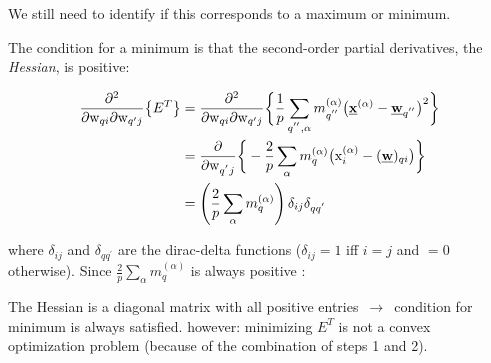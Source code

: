 \begin{frame}

We still need to identify if this corresponds to a maximum or minimum.


The condition for a minimum is that the second-order partial derivatives, the \emph{Hessian}, is positive:

\begin{align}
	\frac{\partial^2}{\partial \mathrm{w}_{qi} \partial \mathrm{w}_{
			q'j}} \big\{ E^T\big\}
	&=
		\frac{\partial^2}{\partial \mathrm{w}_{qi} \partial \mathrm{w}_{
			q'j}} \bigg\{ \frac{1}{p} \sum\limits_{q^{''}, \alpha}
			m_{q^{''}}^{(\alpha)} \big( \vec{x}^{(\alpha)} - \vec{w}_{q^{''}}
			\big)^2 \bigg\} \\
		& = \frac{\partial}{\partial \mathrm{w}_{q^{'}j}} \bigg\{
			-\frac{2}{p} \sum\limits_{\alpha} m_q^{(\alpha)} 
			\big( \mathrm{x}_i^{(\alpha)} - (\vec{w})_{qi}
			\big) \bigg\} \\
\notesonly{
		& = \left( \frac{2}{p} \sum\limits_{\alpha} m_q^{(\alpha)} \right)
			\delta_{ij} \delta_{qq^{'}}
			}
\end{align}
\end{frame}

\begin{frame}

where $\delta_{ij}$ and $\delta_{qq^{'}}$ are the dirac-delta functions ($\delta_{ij}=1$ iff $i=j$ and $=0$ otherwise). 
Since $\frac{2}{p} \sum\limits_{\alpha} m_q^{(\alpha)}$ is always positive :

\begin{itemize}
	 \itR The Hessian is a diagonal matrix with all positive entries $\,\to\,$ condition for minimum is always satisfied.
	 \itR however: minimizing $E^{T}$ is not a convex optimization problem (because of the combination of steps 1 and 2).
\end{itemize} 

\end{frame}

